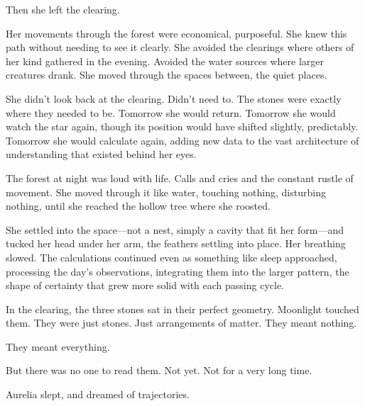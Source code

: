 Then she left the clearing.

Her movements through the forest were economical, purposeful. She knew this path without needing to see it clearly. She avoided the clearings where others of her kind gathered in the evening. Avoided the water sources where larger creatures drank. She moved through the spaces between, the quiet places.

She didn't look back at the clearing. Didn't need to. The stones were exactly where they needed to be. Tomorrow she would return. Tomorrow she would watch the star again, though its position would have shifted slightly, predictably. Tomorrow she would calculate again, adding new data to the vast architecture of understanding that existed behind her eyes.

The forest at night was loud with life. Calls and cries and the constant rustle of movement. She moved through it like water, touching nothing, disturbing nothing, until she reached the hollow tree where she roosted.

She settled into the space—not a nest, simply a cavity that fit her form—and tucked her head under her arm, the feathers settling into place. Her breathing slowed. The calculations continued even as something like sleep approached, processing the day's observations, integrating them into the larger pattern, the shape of certainty that grew more solid with each passing cycle.

In the clearing, the three stones sat in their perfect geometry. Moonlight touched them. They were just stones. Just arrangements of matter. They meant nothing.

They meant everything.

But there was no one to read them. Not yet. Not for a very long time.

Aurelia slept, and dreamed of trajectories.

